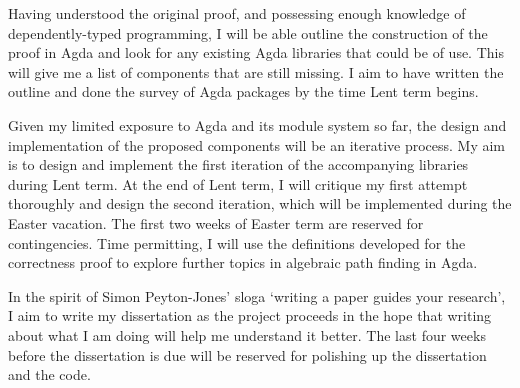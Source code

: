 \documentclass[a4paper]{article}
\begin{document}
Having understood the original proof, and possessing enough knowledge of dependently-typed programming, I will be able outline the construction of the proof in Agda and look for any existing Agda libraries that could be of use.
This will give me a list of components that are still missing.
I aim to have written the outline and done the survey of Agda packages by the time Lent term begins.

Given my limited exposure to Agda and its module system so far, the design and implementation of the proposed components will be an iterative process.
My aim is to design and implement the first iteration of the accompanying libraries during Lent term.
At the end of Lent term, I will critique my first attempt thoroughly and design the second iteration, which will be implemented during the Easter vacation.
The first two weeks of Easter term are reserved for contingencies.
Time permitting, I will use the definitions developed for the correctness proof to explore further topics in algebraic path finding in Agda.

In the spirit of Simon Peyton-Jones' sloga `writing a paper guides your research', I aim to write my dissertation as the project proceeds in the hope that writing about what I am doing will help me understand it better.
The last four weeks before the dissertation is due will be reserved for polishing up the dissertation and the code.


\end{document}
